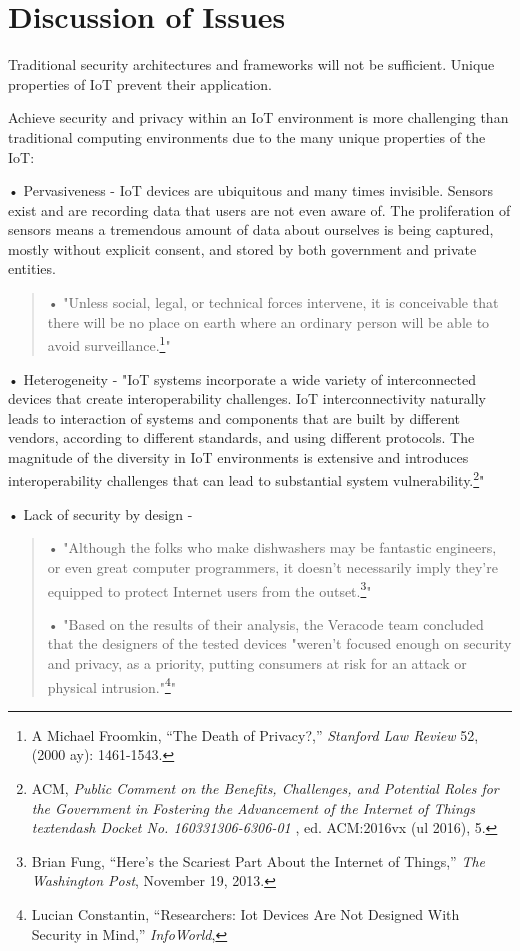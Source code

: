 \section{Discussion of Issues}

Traditional security architectures and frameworks will not be
sufficient. Unique properties of IoT prevent their application.

Achieve security and privacy within an IoT environment is more
challenging than traditional computing environments due to the many
unique properties of the IoT:

• Pervasiveness - IoT devices are ubiquitous and many times invisible.
Sensors exist and are recording data that users are not even aware of.
The proliferation of sensors means a tremendous amount of data about
ourselves is being captured, mostly without explicit consent, and stored
by both government and private entities.

\begin{quote}
• "Unless social, legal, or technical forces intervene, it is
conceivable that there will be no place on earth where an ordinary
person will be able to avoid surveillance.\footnote{A Michael Froomkin,
  ``The Death of Privacy?,'' \emph{Stanford Law Review} 52, (2000 ay):
  1461-1543.}"
\end{quote}

• Heterogeneity - "IoT systems incorporate a wide variety of
interconnected devices that create interoperability challenges. IoT
interconnectivity naturally leads to interaction of systems and
components that are built by different vendors, according to different
standards, and using different protocols. The magnitude of the diversity
in IoT environments is extensive and introduces interoperability
challenges that can lead to substantial system vulnerability.\footnote{ACM,
  \emph{Public Comment on the Benefits, Challenges, and Potential Roles
  for the Government in Fostering the Advancement of the Internet of
  Things textendash Docket No. 160331306-6306-01} , ed. ACM:2016vx (ul
  2016), 5.}"

• Lack of security by design -

\begin{quote}
• "Although the folks who make dishwashers may be fantastic engineers,
or even great computer programmers, it doesn't necessarily imply they're
equipped to protect Internet users from the outset.\footnote{Brian Fung,
  ``Here's the Scariest Part About the Internet of Things,'' \emph{The
  Washington Post}, November 19, 2013.}"

• "Based on the results of their analysis, the Veracode team concluded
that the designers of the tested devices "weren't focused enough on
security and privacy, as a priority, putting consumers at risk for an
attack or physical intrusion."\footnote{Lucian Constantin,
  ``Researchers: Iot Devices Are Not Designed With Security in Mind,''
  \emph{InfoWorld},}"
\end{quote}

